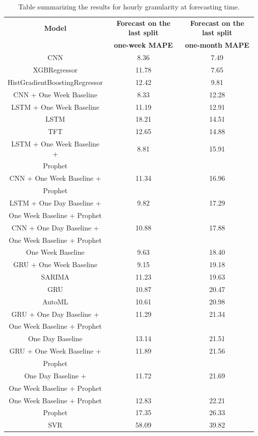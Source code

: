 \begin{table}[H]
\centering
\begin{tabular}{|c|c|c|}
\hline
\textbf{Model} & \textbf{Forecast on the last split} & \textbf{Forecast on the last split}\\
 & \textbf{one-week MAPE} & \textbf{one-month MAPE}\\
\hline
CNN & 8.36 & 7.49\\
\hline
XGBRegressor & 11.78 & 7.65\\
\hline
HistGradientBoostingRegressor & 12.42 & 9.81\\
\hline
CNN + One Week Baseline & 8.33 & 12.28\\
\hline
LSTM + One Week Baseline & 11.19 & 12.91\\
\hline
LSTM & 18.21 & 14.51\\
\hline
TFT & 12.65 & 14.88\\
\hline
LSTM + One Week Baseline + & 8.81 & 15.91\\
Prophet & & \\
\hline
CNN + One Week Baseline + & 11.34 & 16.96\\
Prophet & & \\
\hline
LSTM + One Day Baseline + & 9.82 & 17.29\\
One Week Baseline + Prophet & & \\
\hline
CNN + One Day Baseline + & 10.88 & 17.88\\
One Week Baseline + Prophet & & \\
\hline
One Week Baseline & 9.63 & 18.40\\
\hline
GRU + One Week Baseline & 9.15 & 19.18\\
\hline
SARIMA & 11.23 & 19.63\\
\hline
GRU & 10.87 & 20.47\\
\hline
AutoML & 10.61 & 20.98\\
\hline
GRU + One Day Baseline + & 11.29 & 21.34\\
One Week Baseline + Prophet & & \\
\hline
One Day Baseline & 13.14 & 21.51\\
\hline
GRU + One Week Baseline + & 11.89 & 21.56\\
Prophet & & \\
\hline
One Day Baseline + & 11.72 & 21.69\\
One Week Baseline + Prophet & & \\
\hline
One Week Baseline + Prophet & 12.83 & 22.21\\
\hline
Prophet & 17.35 & 26.33\\
\hline
SVR & 58.09 & 39.82\\
\hline
\end{tabular}
\caption{Table summarizing the results for hourly granularity at forecasting time.}
\label{tab:demanddailyresultsforecast}
\end{table}

